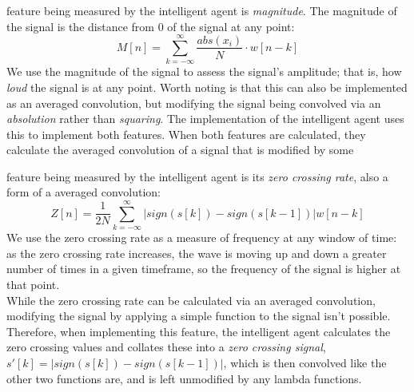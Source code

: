 \documentclass{tufte-handout}
\begin{document}
 feature being measured by the intelligent agent is \emph{magnitude}. The magnitude of the signal is the distance from 0 of the signal at any point:
\[M[n] = \sum_{k = -\infty}^{\infty}\frac{abs(x_i)}{N} \cdot w[n - k]\]
We use the magnitude of the signal to assess the signal's amplitude; that is, how \emph{loud} the signal is at any point. Worth noting is that this can also be implemented as an averaged convolution, but modifying the signal being convolved via an \emph{absolution} rather than \emph{squaring}. The implementation of the intelligent agent uses this to implement both features. When both features are calculated, they calculate the averaged convolution of a signal that is modified by some  \par
{} feature being measured by the intelligent agent is its \emph{zero crossing rate}, also a form of a averaged convolution:
\[Z[n] = \frac{1}{2N} \sum_{k = -\infty}^{\infty} |sign(s[k]) - sign(s[k-1])| w[n - k]\]
We use the zero crossing rate as a measure of frequency at any window of time: as the zero crossing rate increases, the wave is moving up and down a greater number of times in a given timeframe, so the frequency of the signal is higher at that point. \\
\noindent While the zero crossing rate can be calculated via an averaged convolution, modifying the signal by applying a simple function to the signal isn't possible. Therefore, when implementing this feature, the intelligent agent calculates the zero crossing values and collates these into a \emph{zero crossing signal}, \(s'[k] = |sign(s[k]) - sign(s[k-1])|\), which is then convolved like the other two functions are, and is left unmodified by any lambda functions. 
\end{document}
